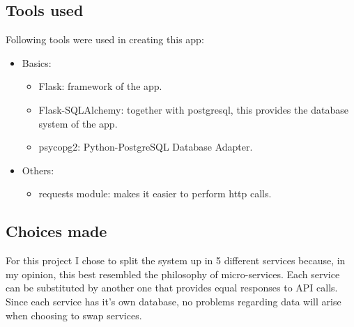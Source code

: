 \documentclass[12pt]{article}
\begin{document}
\subsection{Tools used}
Following tools were used in creating this app:
\begin{itemize}
	\item Basics:
	\begin{itemize}
		\item Flask: framework of the app.
		\item Flask-SQLAlchemy: together with postgresql, this provides the database system of the app.
		\item psycopg2: Python-PostgreSQL Database Adapter.
	\end{itemize}
	\item Others:
	\begin{itemize}
		\item requests module: makes it easier to perform http calls.
	\end{itemize}
\end{itemize}

\subsection{Choices made}
For this project I chose to split the system up in 5 different services because, in my opinion, this best resembled the philosophy of micro-services. Each service can be substituted by another one that provides equal responses to API calls. \\
Since each service has it's own database, no problems regarding data will arise when choosing to swap services.

\end{document}
